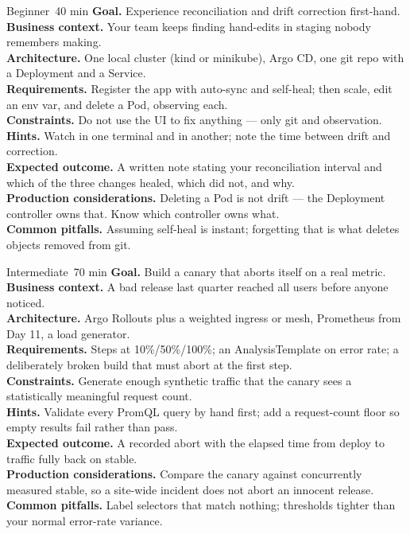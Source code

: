 
\begin{minilab}{Beginner}{~40 min}
\textbf{Goal.} Experience reconciliation and drift correction first-hand.\\
\textbf{Business context.} Your team keeps finding hand-edits in staging nobody remembers making.\\
\textbf{Architecture.} One local cluster (kind or minikube), Argo CD, one git repo with a Deployment and a Service.\\
\textbf{Requirements.} Register the app with auto-sync and self-heal; then scale, edit an env var, and delete a Pod, observing each.\\
\textbf{Constraints.} Do not use the UI to fix anything --- only git and observation.\\
\textbf{Hints.} Watch  in one terminal and  in another; note the time between drift and correction.\\
\textbf{Expected outcome.} A written note stating your reconciliation interval and which of the three changes healed, which did not, and why.\\
\textbf{Production considerations.} Deleting a Pod is not drift --- the Deployment controller owns that. Know which controller owns what.\\
\textbf{Common pitfalls.} Assuming self-heal is instant; forgetting that  is what deletes objects removed from git.
\end{minilab}

\begin{minilab}{Intermediate}{~70 min}
\textbf{Goal.} Build a canary that aborts itself on a real metric.\\
\textbf{Business context.} A bad release last quarter reached all users before anyone noticed.\\
\textbf{Architecture.} Argo Rollouts plus a weighted ingress or mesh, Prometheus from Day 11, a load generator.\\
\textbf{Requirements.} Steps at 10\%/50\%/100\%; an AnalysisTemplate on error rate; a deliberately broken build that must abort at the first step.\\
\textbf{Constraints.} Generate enough synthetic traffic that the canary sees a statistically meaningful request count.\\
\textbf{Hints.} Validate every PromQL query by hand first; add a request-count floor so empty results fail rather than pass.\\
\textbf{Expected outcome.} A recorded abort with the elapsed time from deploy to traffic fully back on stable.\\
\textbf{Production considerations.} Compare the canary against concurrently measured stable, so a site-wide incident does not abort an innocent release.\\
\textbf{Common pitfalls.} Label selectors that match nothing; thresholds tighter than your normal error-rate variance.
\end{minilab}

